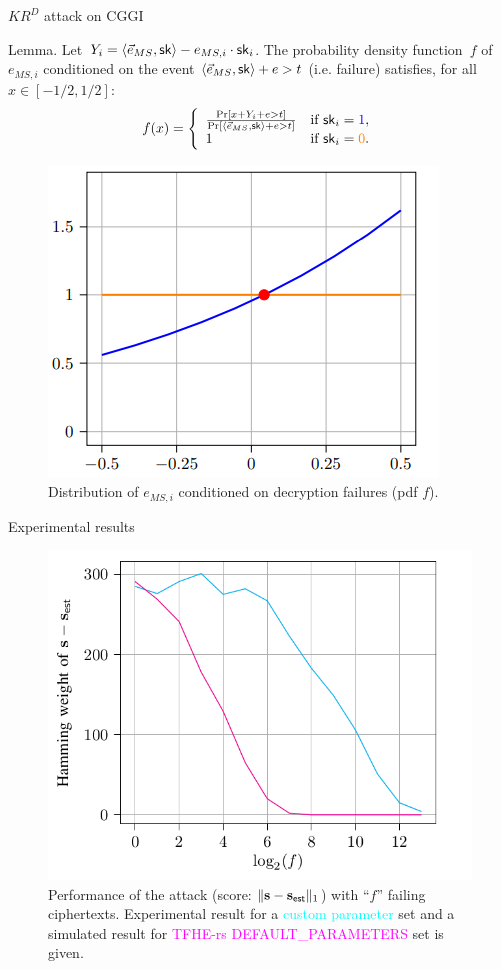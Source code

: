 \documentclass{beamer}
\begin{document}
	\begin{frame}{$KR^D$ attack on CGGI}

    {\small \vspace{-0.1cm}
		\begin{block}{Lemma.}\vspace{0.1cm}
			Let~$Y_i = \langle \vec{e}_{MS}, {\sf sk} \rangle - e_{MS, i} \cdot {\sf sk}_i$.
			The probability density function~$f$ of~$e_{MS,i}$ conditioned on the event $\langle \vec{e}_{MS}, {\sf sk} \rangle + e > t$ (i.e. failure) satisfies, for all~$x \in [-1/2,1/2]$: 
			\[
			f(x) = \left\{
			\begin{array}{ll}
				\frac{\Pr[x + Y_i + e > t]}{\Pr[ \langle \vec{e}_{MS}, {\sf sk} \rangle + e > t]}& \text{if } {\sf sk}_i=\textcolor{blue}{1}, \\
				1& \text{if } {\sf sk}_i = \textcolor{orange}{0}.
			\end{array}\right.\]
		\end{block}\vspace{-0.3cm}\pause
    }

        \begin{figure}[h]
            \centering
            \includegraphics[width=0.4\linewidth]{slope.png}
            \caption{Distribution of $e_{MS, i}$ conditioned on decryption failures (pdf $f$). }
        \end{figure}
	\end{frame}
 
	\begin{frame}{Experimental results}
		\begin{figure}
			\centering
			\includegraphics[width=0.7\linewidth]{exp}
			\caption{Performance of the attack (score: $\Vert \mathbf{s} - \mathbf{s}_\mathsf{est} \Vert_1$) with ``$f$'' failing ciphertexts. Experimental result for a \textcolor{cyan}{custom parameter} set and a simulated result for \textcolor{magenta}{TFHE-rs DEFAULT\_PARAMETERS} set is given.}
			\label{fig:tkrd}
		\end{figure}
	\end{frame}
\end{document}
